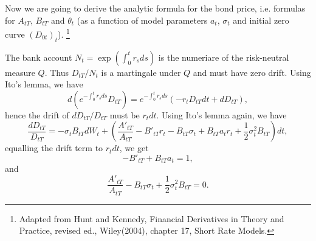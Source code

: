 Now we are going to derive the analytic formula for the bond price, i.e. 
formulas for $A_{tT}$, $B_{tT}$ and $\theta_t$ (as a function of model 
parameters $a_t$, $\sigma_t$ and initial zero curve $(D_{0t})_t$).
\footnote{Adapted from Hunt and Kennedy, Financial Derivatives in Theory and
Practice, revised ed., Wiley(2004), chapter 17, Short Rate Models.}

%

The bank account $N_t=\exp(\int_0^t r_s ds)$ is the numeriare of the
risk-neutral measure $Q$. Thus $D_{tT}/N_t$ is a martingale under $Q$ and must
have zero drift. Using Ito's lemma, we have 
\[
  d(e^{-\int_0^t r_s ds} D_{tT} ) 
     = e^{-\int_0^t r_s ds} ( - r_t D_{tT} dt + dD_{tT} ),
\]
hence the drift of $dD_{tT}/D_{tT}$ must be $r_t dt$. Using Ito's lemma again, 
we have
\[
  \frac{dD_{tT}}{D_{tT}} = -\sigma_t B_{tT} dW_t
    + \left(
       \frac{A'_{tT}}{A_{tT}} - B'_{tT} r_t - B_{tT} \sigma_t + B_{tT} a_t r_t
       + \frac{1}{2} \sigma_t^2 B_{tT}
      \right) dt,
\]
equalling the drift term to $r_t dt$, we get
\[
  - B'_{tT} + B_{tT} a_t = 1,
\]
and 
\[
  \frac{A'_{tT}}{A_{tT}} - B_{tT} \sigma_t + \frac{1}{2} \sigma_t^2 B_{tT} = 0.
\]


